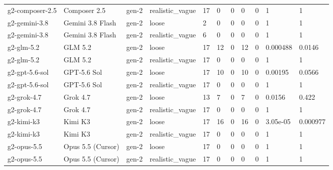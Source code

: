 \begin{tabular}{lllllllllll}
g2-composer-2.5 & Composer 2.5 & gen-2 & realistic\_vague & 17 & 0 & 0 & 0 & 0 & 1 & 1 \\
g2-gemini-3.8 & Gemini 3.8 Flash & gen-2 & loose & 2 & 0 & 0 & 0 & 0 & 1 & 1 \\
g2-gemini-3.8 & Gemini 3.8 Flash & gen-2 & realistic\_vague & 6 & 0 & 0 & 0 & 0 & 1 & 1 \\
g2-glm-5.2 & GLM 5.2 & gen-2 & loose & 17 & 12 & 0 & 12 & 0 & 0.000488 & 0.0146 \\
g2-glm-5.2 & GLM 5.2 & gen-2 & realistic\_vague & 17 & 0 & 0 & 0 & 0 & 1 & 1 \\
g2-gpt-5.6-sol & GPT-5.6 Sol & gen-2 & loose & 17 & 10 & 0 & 10 & 0 & 0.00195 & 0.0566 \\
g2-gpt-5.6-sol & GPT-5.6 Sol & gen-2 & realistic\_vague & 17 & 0 & 0 & 0 & 0 & 1 & 1 \\
g2-grok-4.7 & Grok 4.7 & gen-2 & loose & 13 & 7 & 0 & 7 & 0 & 0.0156 & 0.422 \\
g2-grok-4.7 & Grok 4.7 & gen-2 & realistic\_vague & 17 & 0 & 0 & 0 & 0 & 1 & 1 \\
g2-kimi-k3 & Kimi K3 & gen-2 & loose & 17 & 16 & 0 & 16 & 0 & 3.05e-05 & 0.000977 \\
g2-kimi-k3 & Kimi K3 & gen-2 & realistic\_vague & 17 & 0 & 0 & 0 & 0 & 1 & 1 \\
g2-opus-5.5 & Opus 5.5 (Cursor) & gen-2 & loose & 17 & 0 & 0 & 0 & 0 & 1 & 1 \\
g2-opus-5.5 & Opus 5.5 (Cursor) & gen-2 & realistic\_vague & 17 & 0 & 0 & 0 & 0 & 1 & 1 \\
\bottomrule
\end{tabular}
